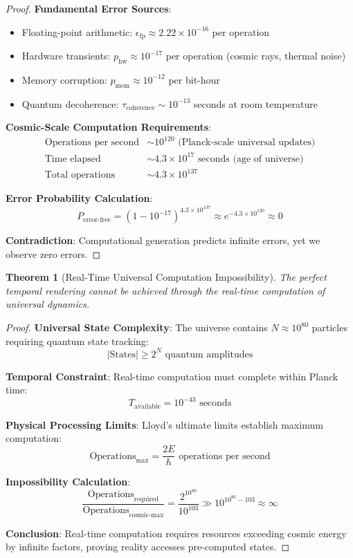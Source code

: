 \documentclass[12pt,a4paper]{article}
\newtheorem{theorem}{Theorem}[section]
\begin{document}
\begin{proof}
\textbf{Fundamental Error Sources}:
\begin{itemize}
    \item Floating-point arithmetic: $\epsilon_{\text{fp}} \approx 2.22 \times 10^{-16}$ per operation
    \item Hardware transients: $p_{\text{hw}} \approx 10^{-17}$ per operation (cosmic rays, thermal noise)
    \item Memory corruption: $p_{\text{mem}} \approx 10^{-12}$ per bit-hour
    \item Quantum decoherence: $\tau_{\text{coherence}} \sim 10^{-13}$ seconds at room temperature
\end{itemize}

\textbf{Cosmic-Scale Computation Requirements}:
\begin{align}
\text{Operations per second} &\sim 10^{120} \text{ (Planck-scale universal updates)} \\
\text{Time elapsed} &\sim 4.3 \times 10^{17} \text{ seconds (age of universe)} \\
\text{Total operations} &\sim 4.3 \times 10^{137}
\end{align}

\textbf{Error Probability Calculation}:
$$P_{\text{error-free}} = (1-10^{-17})^{4.3 \times 10^{137}} \approx e^{-4.3 \times 10^{120}} \approx 0$$

\textbf{Contradiction}: Computational generation predicts infinite errors, yet we observe zero errors.
\end{proof}

\begin{theorem}[Real-Time Universal Computation Impossibility]
The perfect temporal rendering cannot be achieved through the real-time computation of universal dynamics.
\end{theorem}

\begin{proof}
\textbf{Universal State Complexity}: The universe contains $N \approx 10^{80}$ particles requiring quantum state tracking:
$$|\text{States}| \geq 2^N \text{ quantum amplitudes}$$

\textbf{Temporal Constraint}: Real-time computation must complete within Planck time:
$$T_{\text{available}} = 10^{-43} \text{ seconds}$$

\textbf{Physical Processing Limits}: Lloyd's ultimate limits establish maximum computation:
$$\text{Operations}_{\text{max}} = \frac{2E}{\hbar} \text{ operations per second}$$

\textbf{Impossibility Calculation}:
$$\frac{\text{Operations}_{\text{required}}}{\text{Operations}_{\text{cosmic-max}}} = \frac{2^{10^{80}}}{10^{103}} \gg 10^{10^{80}-103} \approx \infty$$

\textbf{Conclusion}: Real-time computation requires resources exceeding cosmic energy by infinite factors, proving reality accesses pre-computed states.
\end{proof}
\end{document}
